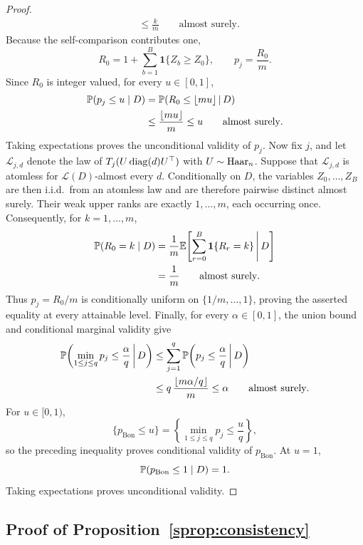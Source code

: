 \begin{proof}
\[\begin{aligned}
&\leq\frac{k}{m}
\qquad\text{almost surely}.
\end{aligned}
\]
Because the self-comparison contributes one,
\[
R_0
=
1+\sum_{b=1}^B\mathbf 1\{Z_b\geq Z_0\},
\qquad
p_j=\frac{R_0}{m}.
\]
Since \(R_0\) is integer valued, for every \(u\in[0,1]\),
\[
\begin{aligned}
\mathbb{P}(p_j\leq u\mid D)
&=
\mathbb{P}\!\left(
R_0\leq\lfloor mu\rfloor
\,\middle|\,D
\right) \\
&\leq
\frac{\lfloor mu\rfloor}{m}
\leq u
\qquad\text{almost surely}.
\end{aligned}
\]
Taking expectations proves the unconditional validity of \(p_j\).
Now fix \(j\), and let \(\mathcal L_{j,d}\) denote the law of
\(T_j(U\operatorname{diag}(d)U^\top)\) with \(U\sim\mathrm{Haar}_n\). Suppose that
\(\mathcal L_{j,d}\) is atomless for \(\mathcal L(D)\)-almost every \(d\). Conditionally on \(D\), the
variables \(Z_0,\ldots,Z_B\) are then i.i.d.\ from an atomless law and
are therefore pairwise distinct almost surely. Their weak upper ranks
are exactly \(1,\ldots,m\), each occurring once. Consequently, for
\(k=1,\ldots,m\),
\[
\begin{aligned}
\mathbb{P}(R_0=k\mid D)
&=
\frac1m
\mathbb{E}\!\left[
\sum_{r=0}^B\mathbf 1\{R_r=k\}
\,\middle|\,D
\right] \\
&=
\frac1m
\qquad\text{almost surely}.
\end{aligned}
\]
Thus \(p_j=R_0/m\) is conditionally uniform on
\(\{1/m,\ldots,1\}\), proving the asserted equality at every
attainable level.
Finally, for every \(\alpha\in[0,1]\), the union bound and conditional
marginal validity give
\[
\begin{aligned}
\mathbb{P}\!\left(
\min_{1\leq j\leq q}p_j
\leq\frac{\alpha}{q}
\,\middle|\,D
\right)
&\leq
\sum_{j=1}^q
\mathbb{P}\!\left(
p_j\leq\frac{\alpha}{q}
\,\middle|\,D
\right) \\
&\leq
q\,
\frac{\lfloor m\alpha/q\rfloor}{m}
\leq\alpha
\qquad\text{almost surely}.
\end{aligned}
\]
For \(u\in[0,1)\),
\[
\{p_{\mathrm{Bon}}\leq u\}
=
\left\{
\min_{1\leq j\leq q}p_j
\leq\frac{u}{q}
\right\},
\]
so the preceding inequality proves conditional validity of
\(p_{\mathrm{Bon}}\). At \(u=1\),
\[
\mathbb{P}(p_{\mathrm{Bon}}\leq1\mid D)=1.
\]
Taking expectations proves unconditional validity.
\end{proof}

\subsection{Proof of Proposition~\ref{sprop:consistency}}

